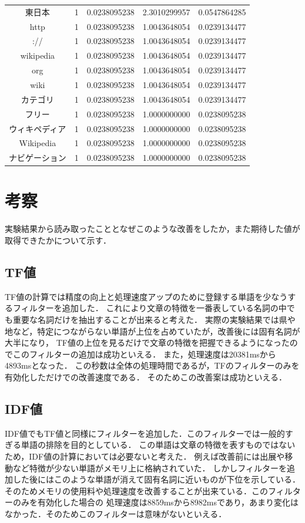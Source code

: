 \documentclass[a4paper,11pt]{ltjsarticle}
\begin{document}
\begin{table}[htbp]
\begin{tabular}{|c|c|c|c|c|}
        東日本       & 1    & 0.0238095238 & 2.3010299957 & 0.0547864285 \\
        http      & 1    & 0.0238095238 & 1.0043648054 & 0.0239134477 \\
        ://       & 1    & 0.0238095238 & 1.0043648054 & 0.0239134477 \\
        wikipedia & 1    & 0.0238095238 & 1.0043648054 & 0.0239134477 \\
        org       & 1    & 0.0238095238 & 1.0043648054 & 0.0239134477 \\
        wiki      & 1    & 0.0238095238 & 1.0043648054 & 0.0239134477 \\
        カテゴリ      & 1    & 0.0238095238 & 1.0043648054 & 0.0239134477 \\
        フリー       & 1    & 0.0238095238 & 1.0000000000 & 0.0238095238 \\
        ウィキペディア   & 1    & 0.0238095238 & 1.0000000000 & 0.0238095238 \\
        Wikipedia & 1    & 0.0238095238 & 1.0000000000 & 0.0238095238 \\
        ナビゲーション   & 1    & 0.0238095238 & 1.0000000000 & 0.0238095238 \\

        \hline
    \end{tabular}
\end{table}
\newpage
\section{考察}
実験結果から読み取ったこととなぜこのような改善をしたか，また期待した値が取得できたかについて示す．
\subsection{TF値}
TF値の計算では精度の向上と処理速度アップのために登録する単語を少なうするフィルターを追加した．
これにより文章の特徴を一番表している名詞の中でも重要な名詞だけを抽出することが出来ると考えた．
実際の実験結果では県や地など，特定につながらない単語が上位を占めていたが，改善後には固有名詞が大半になり，
TF値の上位を見るだけで文章の特徴を把握できるようになったのでこのフィルターの追加は成功といえる．
また，処理速度は20381msから4893msとなった．
この秒数は全体の処理時間であるが，TFのフィルターのみを有効化しただけでの改善速度である．
そのためこの改善案は成功といえる．
\subsection{IDF値}
IDF値でもTF値と同様にフィルターを追加した．このフィルターでは一般的すぎる単語の排除を目的としている．
この単語は文章の特徴を表すものではないため，IDF値の計算においては必要ないと考えた．
例えば改善前には出展や移動など特徴が少ない単語がメモリ上に格納されていた．
しかしフィルターを追加した後にはこのような単語が消えて固有名詞に近いものが下位を示している．
そのためメモリの使用料や処理速度を改善することが出来ている．このフィルターのみを有効化した場合の
処理速度は8859msから8982msであり，あまり変化はなかった．そのためこのフィルターは意味がないといえる．
\end{document}
